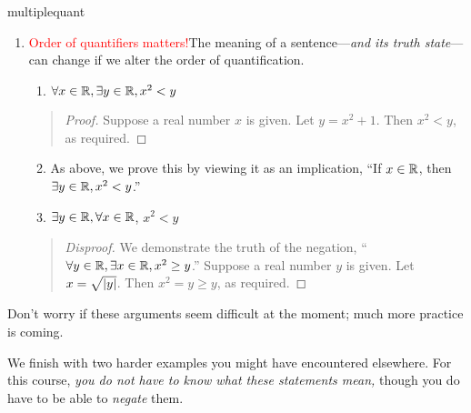 \begin{examples}{}{multiplequant}
\begin{enumerate}
		
	  \item\label{ex:multiplequant2} \textcolor{red}{Order of quantifiers matters!}\lstsp The meaning of a sentence---\emph{and its truth state}---can change if we alter the order of quantification.
	  \begin{enumerate}
	  	\item $\forall x\in\mathbb{R},\exists y\in\mathbb{R},x^2<y$
		\end{enumerate}
		\begin{quote}
			\begin{proof}
				Suppose a real number $x$ is given. Let $y=x^2+1$. Then $x^2<y$, as required.
			\end{proof}
		\end{quote}
	  \begin{enumerate}\setcounter{enumii}{1}\itemsep8pt
	    \item[] As above, we prove this by viewing it as an implication, ``If $x\in\mathbb{R}$, then $\exists y\in\mathbb{R},x^2<y$.''
	  	\item $\exists y\in\mathbb{R},\forall x\in\mathbb{R}$, $x^2<y$
		\end{enumerate}
		\begin{quote}
			\begin{proof}[Disproof]
				We demonstrate the truth of the negation, ``$\forall y\in\mathbb{R},\exists x\in\mathbb{R},x^2\ge y$.''\smallbreak
				Suppose a real number $y$ is given. Let $x=\sqrt{\left| y\right|}$. Then $x^2=y\ge y$, as required.
			\end{proof}
		\end{quote} 
	\end{enumerate}
\end{examples}


Don't worry if these arguments seem difficult at the moment; much more practice is coming.


\goodbreak



We finish with two harder examples you might have encountered elsewhere. For this course, \emph{you do not have to know what these statements mean,} though you do have to be able to \emph{negate} them.  

